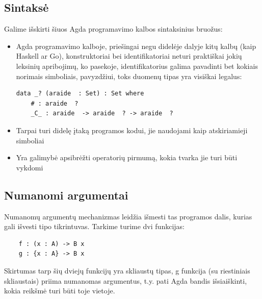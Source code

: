 \documentclass{VUMIFPSkursinis}
\begin{document}
\subsection{Sintaksė}
Galime išskirti šiuos Agda programavimo kalbos sintaksinius bruožus:
\begin{itemize}
	\item {Agda programavimo kalboje, priešingai negu didelėje dalyje kitų kalbų (kaip Haskell ar Go), konstruktoriai bei identifikatoriai neturi praktiškai jokių leksinių apribojimų, ko pasekoje, identifikatorius galima pavadinti bet kokiais norimais simboliais, pavyzdžiui, toks duomenų tipas yra visiškai legalus:
	\begin{lstlisting}
data _? (araide  : Set) : Set where
	# : araide  ?
	_C_ : araide  -> araide  ? -> araide  ?
	\end{lstlisting}
	}
	\item Tarpai turi didelę įtaką programos kodui, jie naudojami kaip atskiriamieji simboliai
	\item Yra galimybė apsibrėžti operatorių pirmumą, kokia tvarka jie turi būti vykdomi 
\end{itemize}
\subsection{Numanomi argumentai}
Numanomų argumentų mechanizmas leidžia išmesti tas programos dalis, kurias gali išvesti tipo tikrintuvas. Tarkime turime dvi funkcijas:
\begin{lstlisting}
	f : (x : A) -> B x
	g : {x : A} -> B x
\end{lstlisting}
Skirtumas tarp šių dviejų funkcijų yra skliaustų tipas, g funkcija (su riestiniais skliaustais) priima numanomas argumentus, t.y. pati Agda bandis išsiaiškinti, kokia reikšmė turi būti toje vietoje.
\end{document}
